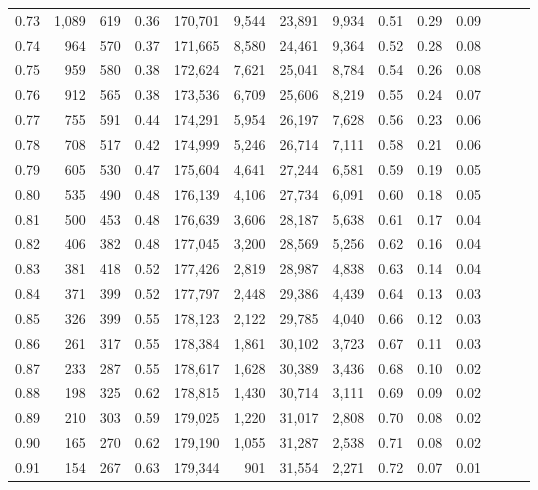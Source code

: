 \begin{tabular}{rrrrrrrrrrrrrr}
0.73 &  1,089 &  619 &  0.36 &  170,701 &    9,544 &  23,891 &   9,934 &  0.51 &  0.29 &      0.09 \\
0.74 &    964 &  570 &  0.37 &  171,665 &    8,580 &  24,461 &   9,364 &  0.52 &  0.28 &      0.08 \\
0.75 &    959 &  580 &  0.38 &  172,624 &    7,621 &  25,041 &   8,784 &  0.54 &  0.26 &      0.08 \\
0.76 &    912 &  565 &  0.38 &  173,536 &    6,709 &  25,606 &   8,219 &  0.55 &  0.24 &      0.07 \\
0.77 &    755 &  591 &  0.44 &  174,291 &    5,954 &  26,197 &   7,628 &  0.56 &  0.23 &      0.06 \\
0.78 &    708 &  517 &  0.42 &  174,999 &    5,246 &  26,714 &   7,111 &  0.58 &  0.21 &      0.06 \\
0.79 &    605 &  530 &  0.47 &  175,604 &    4,641 &  27,244 &   6,581 &  0.59 &  0.19 &      0.05 \\
0.80 &    535 &  490 &  0.48 &  176,139 &    4,106 &  27,734 &   6,091 &  0.60 &  0.18 &      0.05 \\
0.81 &    500 &  453 &  0.48 &  176,639 &    3,606 &  28,187 &   5,638 &  0.61 &  0.17 &      0.04 \\
0.82 &    406 &  382 &  0.48 &  177,045 &    3,200 &  28,569 &   5,256 &  0.62 &  0.16 &      0.04 \\
0.83 &    381 &  418 &  0.52 &  177,426 &    2,819 &  28,987 &   4,838 &  0.63 &  0.14 &      0.04 \\
0.84 &    371 &  399 &  0.52 &  177,797 &    2,448 &  29,386 &   4,439 &  0.64 &  0.13 &      0.03 \\
0.85 &    326 &  399 &  0.55 &  178,123 &    2,122 &  29,785 &   4,040 &  0.66 &  0.12 &      0.03 \\
0.86 &    261 &  317 &  0.55 &  178,384 &    1,861 &  30,102 &   3,723 &  0.67 &  0.11 &      0.03 \\
0.87 &    233 &  287 &  0.55 &  178,617 &    1,628 &  30,389 &   3,436 &  0.68 &  0.10 &      0.02 \\
0.88 &    198 &  325 &  0.62 &  178,815 &    1,430 &  30,714 &   3,111 &  0.69 &  0.09 &      0.02 \\
0.89 &    210 &  303 &  0.59 &  179,025 &    1,220 &  31,017 &   2,808 &  0.70 &  0.08 &      0.02 \\
0.90 &    165 &  270 &  0.62 &  179,190 &    1,055 &  31,287 &   2,538 &  0.71 &  0.08 &      0.02 \\
0.91 &    154 &  267 &  0.63 &  179,344 &      901 &  31,554 &   2,271 &  0.72 &  0.07 &      0.01 \\

\end{tabular}

